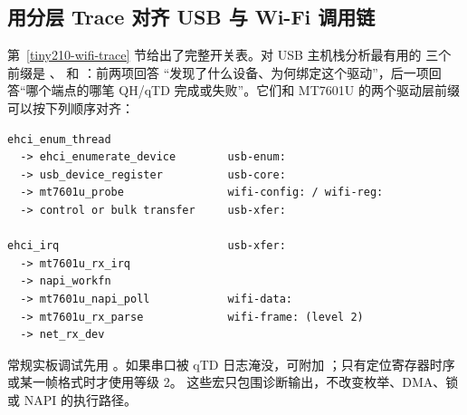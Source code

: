 \subsection{用分层 Trace 对齐 USB 与 Wi-Fi 调用链}\label{wa:usb-wifi-trace}

第~\ref{tiny210-wifi-trace} 节给出了完整开关表。对 USB 主机栈分析最有用的
三个前缀是 、 和 ：前两项回答
“发现了什么设备、为何绑定这个驱动”，后一项回答“哪个端点的哪笔 QH/qTD
完成或失败”。它们和 MT7601U 的两个驱动层前缀可以按下列顺序对齐：

\begin{lstlisting}
ehci_enum_thread
  -> ehci_enumerate_device        usb-enum:
  -> usb_device_register          usb-core:
  -> mt7601u_probe                wifi-config: / wifi-reg:
  -> control or bulk transfer     usb-xfer:

ehci_irq                          usb-xfer:
  -> mt7601u_rx_irq
  -> napi_workfn
  -> mt7601u_napi_poll            wifi-data:
  -> mt7601u_rx_parse             wifi-frame: (level 2)
  -> net_rx_dev
\end{lstlisting}

常规实板调试先用 。如果串口被 qTD 日志淹没，可附加
；只有定位寄存器时序或某一帧格式时才使用等级 2。
这些宏只包围诊断输出，不改变枚举、DMA、锁或 NAPI 的执行路径。

